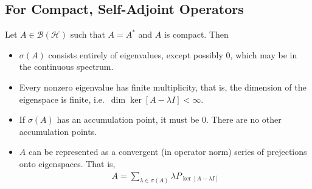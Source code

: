 \documentclass{article}
\def\hilb{\mathcal{H}}
\begin{document}
    \subsection{For Compact, Self-Adjoint Operators}
        Let $A \in \mathcal{B}(\hilb)$ such that $A = A^*$ and $A$ is compact.  Then
        \begin{itemize}
            \item $\sigma(A)$ consists entirely of eigenvalues, except possibly $0$, which may be in the continuous spectrum.
            \item Every nonzero eigenvalue has finite multiplicity, that is, the dimension of the eigenspace is finite, i.e.~$\dim\ker[A - \lambda I] < \infty$.
            \item If $\sigma(A)$ has an accumulation point, it must be $0$.  There are no other accumulation points.
            \item $A$ can be represented as a convergent (in operator norm) series of prejections onto eigenspaces.  That is,
            \begin{align*}
                A = \sum_{\lambda \in \sigma(A)}\lambda P_{\ker [A - \lambda I]}
            \end{align*}
        \end{itemize}
    
\end{document}
